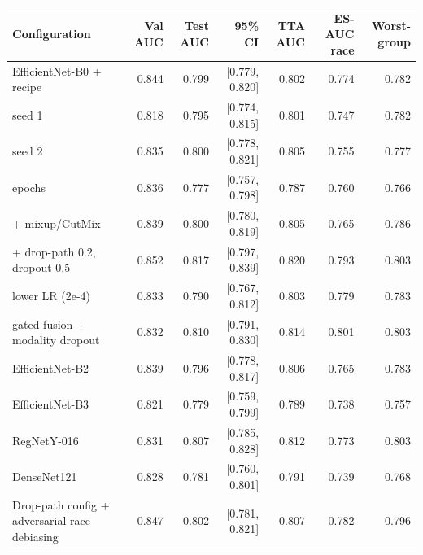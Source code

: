 \begin{tabular}{lrrrrrr}
\toprule
Configuration & Val AUC & Test AUC & 95\% CI & TTA AUC & ES-AUC race & Worst-group \\
\midrule
EfficientNet-B0 + recipe & 0.844 & 0.799 & [0.779, 0.820] & 0.802 & 0.774 & 0.782 \\
\quad seed 1 & 0.818 & 0.795 & [0.774, 0.815] & 0.801 & 0.747 & 0.782 \\
\quad seed 2 & 0.835 & 0.800 & [0.778, 0.821] & 0.805 & 0.755 & 0.777 \\
\quad 12 epochs & 0.836 & 0.777 & [0.757, 0.798] & 0.787 & 0.760 & 0.766 \\
\quad + mixup/CutMix & 0.839 & 0.800 & [0.780, 0.819] & 0.805 & 0.765 & 0.786 \\
\quad + drop-path 0.2, dropout 0.5 & 0.852 & 0.817 & [0.797, 0.839] & 0.820 & 0.793 & 0.803 \\
\quad lower LR (2e-4) & 0.833 & 0.790 & [0.767, 0.812] & 0.803 & 0.779 & 0.783 \\
\quad gated fusion + modality dropout & 0.832 & 0.810 & [0.791, 0.830] & 0.814 & 0.801 & 0.803 \\
\midrule
EfficientNet-B2 & 0.839 & 0.796 & [0.778, 0.817] & 0.806 & 0.765 & 0.783 \\
EfficientNet-B3 & 0.821 & 0.779 & [0.759, 0.799] & 0.789 & 0.738 & 0.757 \\
RegNetY-016 & 0.831 & 0.807 & [0.785, 0.828] & 0.812 & 0.773 & 0.803 \\
DenseNet121 & 0.828 & 0.781 & [0.760, 0.801] & 0.791 & 0.739 & 0.768 \\
\midrule
Drop-path config + adversarial race debiasing & 0.847 & 0.802 & [0.781, 0.821] & 0.807 & 0.782 & 0.796 \\
\bottomrule
\end{tabular}
